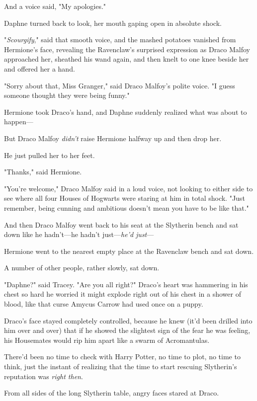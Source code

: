 And a voice said, "My apologies."

Daphne turned back to look, her mouth gaping open in absolute shock.

"\emph{Scourgify}," said that smooth voice, and the mashed potatoes vanished 
from Hermione's face, revealing the Ravenclaw's surprised expression as Draco 
Malfoy approached her, sheathed his wand again, and then knelt to one knee 
beside her and offered her a hand.

"Sorry about that, Miss Granger," said Draco Malfoy's polite voice. "I guess 
someone thought they were being funny."

Hermione took Draco's hand, and Daphne suddenly realized what was about to 
happen---

But Draco Malfoy \emph{didn't} raise Hermione halfway up and then drop her.

He just pulled her to her feet.

"Thanks," said Hermione.

"You're welcome," Draco Malfoy said in a loud voice, not looking to either side 
to see where all four Houses of Hogwarts were staring at him in total shock. 
"Just remember, being cunning and ambitious doesn't mean you have to be like 
that."

And then Draco Malfoy went back to his seat at the Slytherin bench and sat down 
like he hadn't---he hadn't just---\emph{he'd just}---

Hermione went to the nearest empty place at the Ravenclaw bench and sat down.

A number of other people, rather slowly, sat down.

"Daphne?" said Tracey. "Are you all right?"
\sbreak
Draco's heart was hammering in his chest so hard he worried it might explode 
right out of his chest in a shower of blood, like that curse Amycus Carrow had 
used once on a puppy.

Draco's face stayed completely controlled, because he knew (it'd been drilled 
into him over and over) that if he showed the slightest sign of the fear he was 
feeling, his Housemates would rip him apart like a swarm of Acromantulas.

There'd been no time to check with Harry Potter, no time to plot, no time to 
think, just the instant of realizing that the time to start rescuing 
Slytherin's reputation was \emph{right then}.

From all sides of the long Slytherin table, angry faces stared at Draco.

